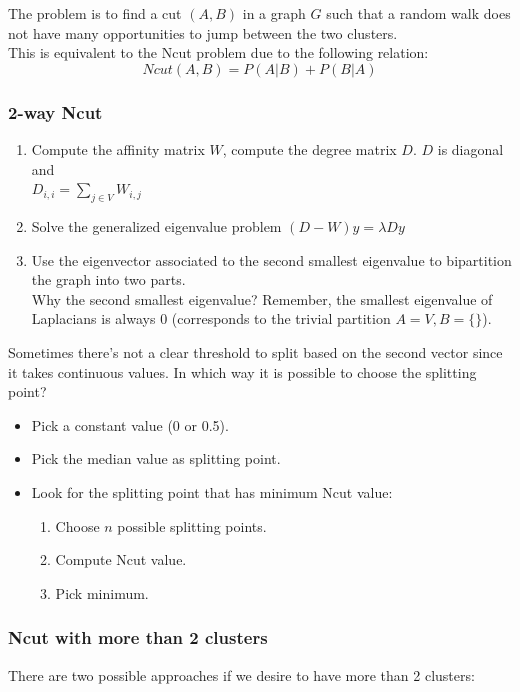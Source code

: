 The problem is to find a cut $(A,B)$ in a graph $G$ such that a random walk does not have many opportunities to jump between the two clusters.\\
This is equivalent to the Ncut problem due to the following relation:
$$Ncut(A,B) = P(A|B) + P(B|A)$$
\subsubsection{2-way Ncut}
\begin{enumerate}
	\item Compute the affinity matrix $W$, compute the degree matrix $D$. $D$ is diagonal and \\$D_{i,i} = \sum_{j \in V} W_{i,j}$
	\item Solve the generalized eigenvalue problem $(D-W)y = \lambda Dy$
	\item Use the eigenvector associated to the second smallest eigenvalue to bipartition the graph into two parts.\\
	Why the second smallest eigenvalue? Remember, the smallest eigenvalue of Laplacians is always 0 (corresponds to the trivial partition $A = V, B=\{\}$).
\end{enumerate}

Sometimes there's not a clear threshold to split based on the second vector since it takes continuous values. In which way it is possible to choose the splitting point?
\begin{itemize}
	\item Pick a constant value (0 or 0.5).
	\item Pick the median value as splitting point.
	\item Look for the splitting point that has minimum Ncut value:
	\begin{enumerate}
		\item Choose $n$ possible splitting points.
		\item Compute Ncut value.
		\item Pick minimum.
	\end{enumerate}
\end{itemize}

\subsubsection{Ncut with more than 2 clusters}
There are two possible approaches if we desire to have more than 2 clusters:
